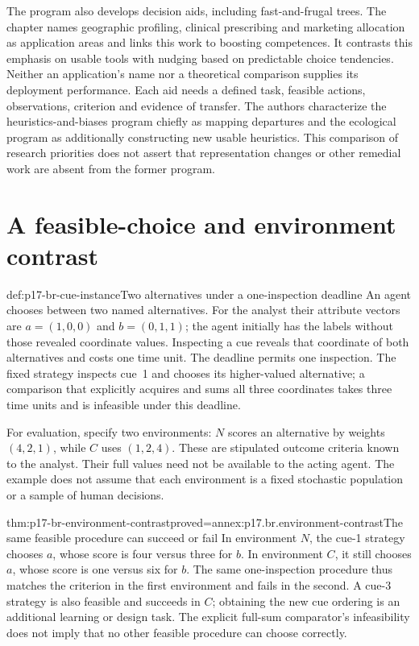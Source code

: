 The program also develops decision aids, including fast-and-frugal trees.
The chapter names geographic profiling, clinical prescribing and marketing
allocation as application areas and links this work to boosting competences.
It contrasts this emphasis on usable tools with nudging based on predictable
choice tendencies. Neither an application's name nor a theoretical
comparison supplies its deployment performance. Each aid needs a defined
task, feasible actions, observations, criterion and evidence of transfer.
The authors characterize the heuristics-and-biases program chiefly as
mapping departures and the ecological program as additionally constructing
new usable heuristics. This comparison of research priorities does not
assert that representation changes or other remedial work are absent
from the former program.

\section{A feasible-choice and environment contrast}
\label{sec:p17-br-worked-environments}

\begin{hbexample}{def:p17-br-cue-instance}{Two alternatives under a one-inspection deadline}
An agent chooses between two named alternatives. For the analyst their
attribute vectors are \(a=(1,0,0)\) and \(b=(0,1,1)\); the agent
initially has the labels without those revealed coordinate values.
Inspecting a cue reveals that coordinate of both alternatives and costs
one time unit. The deadline permits one inspection. The fixed strategy
inspects cue~1 and chooses its higher-valued alternative; a comparison
that explicitly acquires and sums all three coordinates takes three
time units and is infeasible under this deadline.

For evaluation, specify two environments: \(N\) scores an alternative
by weights \((4,2,1)\), while \(C\) uses \((1,2,4)\).
These are stipulated outcome criteria known to the analyst. Their full
values need not be available to the acting agent. The example does not
assume that each environment is a fixed stochastic population or a
sample of human decisions.
\end{hbexample}

\begin{hbtheorem}{thm:p17-br-environment-contrast}{proved=annex:p17.br.environment-contrast}{The same feasible procedure can succeed or fail}
In environment \(N\), the cue-1 strategy chooses \(a\), whose
score is four versus three for \(b\). In environment \(C\), it
still chooses \(a\), whose score is one versus six for \(b\).
The same one-inspection procedure thus matches the criterion in the first
environment and fails in the second. A cue-3 strategy is also feasible
and succeeds in \(C\); obtaining the new cue ordering is an additional
learning or design task. The explicit full-sum comparator's infeasibility
does not imply that no other feasible procedure can choose correctly.
\end{hbtheorem}

